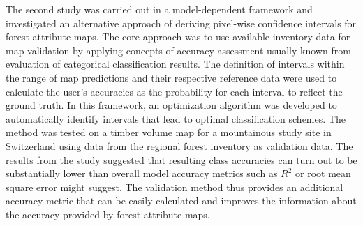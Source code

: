 The second study was carried out in a model-dependent framework and investigated an alternative approach of deriving pixel-wise confidence intervals for forest attribute maps. The core approach was to use available inventory data for map validation by applying concepts of accuracy assessment usually known from evaluation of categorical classification results. The definition of intervals within the range of map predictions and their respective reference data were used to calculate the user's accuracies as the probability for each interval to reflect the ground truth. In this framework, an optimization algorithm was developed to automatically identify intervals that lead to optimal classification schemes. The method was tested on a timber volume map for a mountainous study site in Switzerland using data from the regional forest inventory as validation data. The results from the study suggested that resulting class accuracies can turn out to be substantially lower than overall model accuracy metrics such as $R^2$ or root mean square error might suggest. The validation method thus provides an additional accuracy metric that can be easily calculated and improves the information about the accuracy provided by forest attribute maps.
